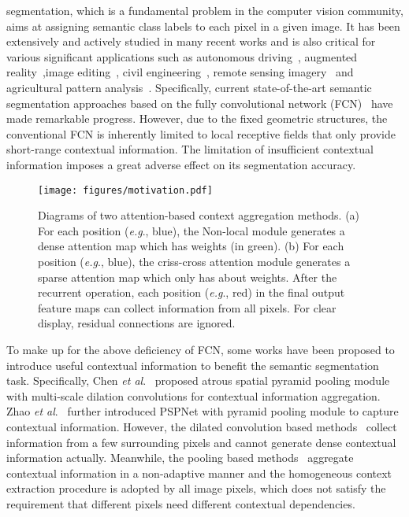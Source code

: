 \documentclass[10pt,journal,compsoc]{IEEEtran}
\def\eg{\emph{e.g}.} \def\Eg{\emph{E.g}.}
\def\etal{\emph{et al}.}
\begin{document}
 segmentation, which is a fundamental problem in the computer vision community, aims at assigning semantic class labels to each pixel in a given image. It has been extensively and actively studied in many recent works and is also critical for various significant applications such as autonomous driving~\cite{fritsch2013new}, augmented reality~\cite{azuma1997survey},image editing~\cite{evening2012adobe}, civil engineering~\cite{song2020deep}, remote sensing imagery~\cite{Zheng_2020_CVPR} and agricultural pattern analysis~\cite{chiu2020agriculture,tik20201st}. Specifically, current state-of-the-art semantic segmentation approaches based on the fully convolutional network (FCN)~\cite{long2015fully} have made remarkable progress. However, due to the fixed geometric structures, the conventional FCN is inherently limited to local receptive fields that only provide short-range contextual information. The limitation of insufficient contextual information imposes a great adverse effect on its segmentation accuracy.

\begin{figure}[!t]
    \centering
    \texttt{[image: figures/motivation.pdf]}
    \caption{Diagrams of two attention-based context aggregation methods. (a) For each position (\eg, blue), the Non-local module \cite{wang2018non} generates a dense attention map which has  weights (in green). (b) For each position (\eg, blue), the criss-cross attention module generates a sparse attention map which only has about  weights. After the recurrent operation, each position (\eg, red) in the final output feature maps can collect information from all pixels. For clear display, residual connections are ignored.}
    \label{fig:motivation}
    \vspace{-5mm}
\end{figure}

To make up for the above deficiency of FCN, some works have been proposed to introduce useful contextual information to benefit the semantic segmentation task. Specifically, Chen \etal~\cite{chen2018deeplab} proposed atrous spatial pyramid pooling module with multi-scale dilation convolutions for contextual information aggregation. Zhao \etal~\cite{zhao2017pyramid} further introduced PSPNet with pyramid pooling module to capture contextual information.
However, the dilated convolution based methods~\cite{chen2017rethinking, chen2018deeplab, Ding_2018_CVPR} collect information from a few surrounding pixels and cannot generate dense contextual information actually. Meanwhile, the pooling based methods~\cite{zhao2017pyramid, zhang2018context} aggregate contextual information in a non-adaptive manner and the homogeneous context extraction procedure is adopted by all image pixels, which does not satisfy the requirement that different pixels need different contextual dependencies.
\end{document}
